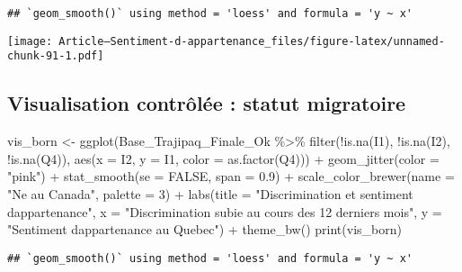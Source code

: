 \documentclass[
]{article}
\newenvironment{Shaded}{\begin{snugshade}}{\end{snugshade}}
\newcommand{\AttributeTok}[1]{\textcolor[rgb]{0.77,0.63,0.00}{#1}}
\newcommand{\ConstantTok}[1]{\textcolor[rgb]{0.00,0.00,0.00}{#1}}
\newcommand{\DecValTok}[1]{\textcolor[rgb]{0.00,0.00,0.81}{#1}}
\newcommand{\FloatTok}[1]{\textcolor[rgb]{0.00,0.00,0.81}{#1}}
\newcommand{\FunctionTok}[1]{\textcolor[rgb]{0.00,0.00,0.00}{#1}}
\newcommand{\NormalTok}[1]{#1}
\newcommand{\OtherTok}[1]{\textcolor[rgb]{0.56,0.35,0.01}{#1}}
\newcommand{\SpecialCharTok}[1]{\textcolor[rgb]{0.00,0.00,0.00}{#1}}
\newcommand{\StringTok}[1]{\textcolor[rgb]{0.31,0.60,0.02}{#1}}
\begin{document}
\begin{verbatim}
## `geom_smooth()` using method = 'loess' and formula = 'y ~ x'
\end{verbatim}

\texttt{[image: Article---Sentiment-d-appartenance\_files/figure-latex/unnamed-chunk-91-1.pdf]}

\hypertarget{visualisation-contruxf4luxe9e-statut-migratoire}{%
\subsection{Visualisation contrôlée : statut
migratoire}\label{visualisation-contruxf4luxe9e-statut-migratoire}}

\begin{Shaded}
\begin{Highlighting}[]
\NormalTok{vis\_born }\OtherTok{\textless{}{-}} \FunctionTok{ggplot}\NormalTok{(Base\_Trajipaq\_Finale\_Ok }\SpecialCharTok{\%\textgreater{}\%}
                \FunctionTok{filter}\NormalTok{(}\SpecialCharTok{!}\FunctionTok{is.na}\NormalTok{(I1), }\SpecialCharTok{!}\FunctionTok{is.na}\NormalTok{(I2), }\SpecialCharTok{!}\FunctionTok{is.na}\NormalTok{(Q4)), }\FunctionTok{aes}\NormalTok{(}\AttributeTok{x =}\NormalTok{ I2, }\AttributeTok{y =}\NormalTok{ I1, }\AttributeTok{color =} \FunctionTok{as.factor}\NormalTok{(Q4))) }\SpecialCharTok{+}
  \FunctionTok{geom\_jitter}\NormalTok{(}\AttributeTok{color =} \StringTok{"pink"}\NormalTok{) }\SpecialCharTok{+}
  \FunctionTok{stat\_smooth}\NormalTok{(}\AttributeTok{se =} \ConstantTok{FALSE}\NormalTok{, }\AttributeTok{span =} \FloatTok{0.9}\NormalTok{) }\SpecialCharTok{+}
  \FunctionTok{scale\_color\_brewer}\NormalTok{(}\AttributeTok{name =} \StringTok{"Ne au Canada"}\NormalTok{, }\AttributeTok{palette =} \DecValTok{3}\NormalTok{) }\SpecialCharTok{+}
  \FunctionTok{labs}\NormalTok{(}\AttributeTok{title =} \StringTok{"Discrimination et sentiment d\textquotesingle{}appartenance"}\NormalTok{, }
       \AttributeTok{x =} \StringTok{"Discrimination subie au cours des 12 derniers mois"}\NormalTok{, }
       \AttributeTok{y =} \StringTok{"Sentiment d\textquotesingle{}appartenance au Quebec"}\NormalTok{) }\SpecialCharTok{+}
  \FunctionTok{theme\_bw}\NormalTok{()}
\FunctionTok{print}\NormalTok{(vis\_born)}
\end{Highlighting}
\end{Shaded}

\begin{verbatim}
## `geom_smooth()` using method = 'loess' and formula = 'y ~ x'
\end{verbatim}
\end{document}
